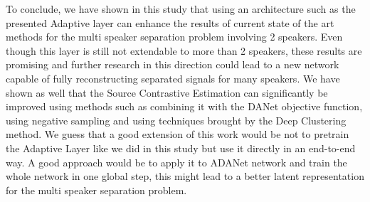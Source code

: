 \documentclass[master, tikz, final,11pt, dvipdfmx]{iscs-thesis}
\begin{document}
To conclude, we have shown in this study that using an architecture such as the presented Adaptive layer can enhance the results of current state of the art methods for the multi speaker separation problem involving 2 speakers. Even though this layer is still not extendable to more than 2 speakers, these results are promising and further research in this direction could lead to a new network capable of fully reconstructing separated signals for many speakers.
We have shown as well that the Source Contrastive Estimation can significantly be improved using methods such as combining it with the DANet objective function, using negative sampling and using techniques brought by the Deep Clustering method.
We guess that a good extension of this work would be not to pretrain the Adaptive Layer like we did in this study but use it directly in an end-to-end way. A good approach would be to apply it to ADANet \cite{DANet2} network and train the whole network in one global step, this might lead to a better latent representation for the multi speaker separation problem.





\end{document}
